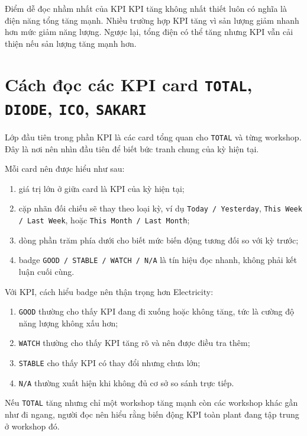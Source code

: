 \begin{ReaderNote}{Điểm dễ đọc nhầm nhất của KPI}
KPI tăng không nhất thiết luôn có nghĩa là điện năng tổng tăng mạnh. Nhiều trường hợp KPI tăng vì sản lượng giảm nhanh hơn mức giảm năng lượng. Ngược lại, tổng điện có thể tăng nhưng KPI vẫn cải thiện nếu sản lượng tăng mạnh hơn.
\end{ReaderNote}

\section{Cách đọc các KPI card \texttt{TOTAL}, \texttt{DIODE}, \texttt{ICO}, \texttt{SAKARI}}

Lớp đầu tiên trong phần KPI là các card tổng quan cho \texttt{TOTAL} và từng workshop. Đây là nơi nên nhìn đầu tiên để biết bức tranh chung của kỳ hiện tại.

Mỗi card nên được hiểu như sau:

\begin{enumerate}[label=-]
\item giá trị lớn ở giữa card là KPI của kỳ hiện tại;
\item cặp nhãn đối chiếu sẽ thay theo loại kỳ, ví dụ \texttt{Today / Yesterday}, \texttt{This Week / Last Week}, hoặc \texttt{This Month / Last Month};
\item dòng phần trăm phía dưới cho biết mức biến động tương đối so với kỳ trước;
\item badge \texttt{GOOD / STABLE / WATCH / N/A} là tín hiệu đọc nhanh, không phải kết luận cuối cùng.
\end{enumerate}

Với KPI, cách hiểu badge nên thận trọng hơn Electricity:

\begin{enumerate}[label=-]
\item \texttt{GOOD} thường cho thấy KPI đang đi xuống hoặc không tăng, tức là cường độ năng lượng không xấu hơn;
\item \texttt{WATCH} thường cho thấy KPI tăng rõ và nên được điều tra thêm;
\item \texttt{STABLE} cho thấy KPI có thay đổi nhưng chưa lớn;
\item \texttt{N/A} thường xuất hiện khi không đủ cơ sở so sánh trực tiếp.
\end{enumerate}

Nếu \texttt{TOTAL} tăng nhưng chỉ một workshop tăng mạnh còn các workshop khác gần như đi ngang, người đọc nên hiểu rằng biến động KPI toàn plant đang tập trung ở workshop đó.

